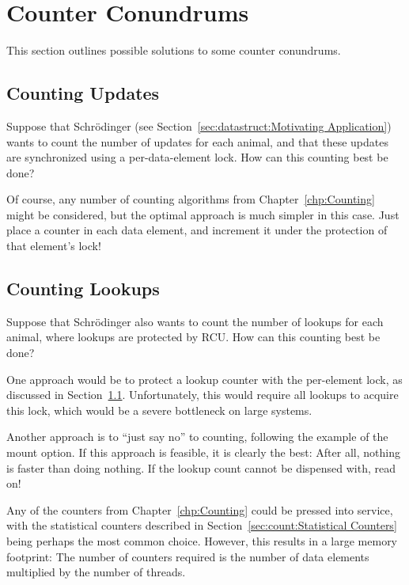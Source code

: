 
\section{Counter Conundrums}
\label{sec:together:Counter Conundrums}

This section outlines possible solutions to some counter conundrums.

\subsection{Counting Updates}
\label{sec:together:Counting Updates}

Suppose that Schr\"odinger (see
Section~\ref{sec:datastruct:Motivating Application})
wants to count the number of updates for each animal,
and that these updates are synchronized using a per-data-element lock.
How can this counting best be done?

Of course, any number of counting algorithms from
Chapter~\ref{chp:Counting}
might be considered, but the optimal approach is much simpler in this case.
Just place a counter in each data element, and increment it under the
protection of that element's lock!

\subsection{Counting Lookups}
\label{sec:together:Counting Lookups}

Suppose that Schr\"odinger also wants to count the number of lookups for
each animal, where lookups are protected by RCU.
How can this counting best be done?

One approach would be to protect a lookup counter with the per-element
lock, as discussed in
Section~\ref{sec:together:Counting Updates}.
Unfortunately, this would require all lookups to acquire this lock,
which would be a severe bottleneck on large systems.

Another approach is to ``just say no'' to counting, following the example
of the  mount option.
If this approach is feasible, it is clearly the best:  After all, nothing
is faster than doing nothing.
If the lookup count cannot be dispensed with, read on!

Any of the counters from
Chapter~\ref{chp:Counting}
could be pressed into service, with the statistical counters described in
Section~\ref{sec:count:Statistical Counters}
being perhaps the most common choice.
However, this results in a large memory footprint: The number of counters
required is the number of data elements multiplied by the number of
threads.

